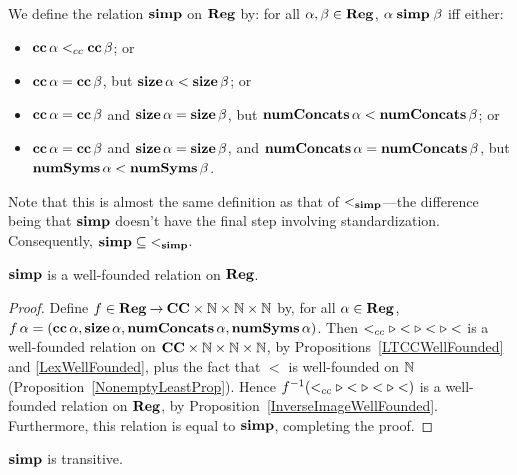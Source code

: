 We define the relation $\mathrel{\mathbf{simp}}$ on $\mathbf{Reg}$ by: for all $\alpha,\beta\in
\mathbf{Reg}$, $\alpha\mathrel{\mathbf{simp}}\beta$ iff either:
\begin{itemize}
\item $\mathbf{cc}\,\alpha\mathrel{<_{cc}}\mathbf{cc}\,\beta$; or

\item $\mathbf{cc}\,\alpha = \mathbf{cc}\,\beta$, but $\mathbf{size}\,\alpha < \mathbf{size}\,\beta$; or

\item $\mathbf{cc}\,\alpha = \mathbf{cc}\,\beta$ and $\mathbf{size}\,\alpha = \mathbf{size}\,\beta$,
  but $\mathbf{numConcats}\,\alpha < \mathbf{numConcats}\,\beta$; or

\item $\mathbf{cc}\,\alpha = \mathbf{cc}\,\beta$ and $\mathbf{size}\,\alpha =
  \mathbf{size}\,\beta$, and $\mathbf{numConcats}\,\alpha = \mathbf{numConcats}\,\beta$, but
  $\mathbf{numSyms}\,\alpha < \mathbf{numSyms}\,\beta$.
\end{itemize}
Note that this is almost the same definition as that of
$\mathrel{<_{\mathbf{simp}}}$---the difference being that $\mathrel{\mathbf{simp}}$ doesn't have the final
step involving standardization. Consequently, ${\mathrel{\mathbf{simp}}}\subseteq{\mathrel{<_{\mathbf{simp}}}}$.

\begin{proposition}
\label{SimpWF}
$\mathrel{\mathbf{simp}}$ is a well-founded relation on $\mathbf{Reg}$.
\end{proposition}

\begin{proof}
Define $f\in\mathbf{Reg}\mathbin{\to} \mathbf{CC}\times\mathbb{N}\times\mathbb{N}\times\mathbb{N}$ by, for all
$\alpha\in\mathbf{Reg}$,
$f\,\alpha = (\mathbf{cc}\,\alpha,\mathbf{size}\,\alpha,
\mathbf{numConcats}\,\alpha,\mathbf{numSyms}\,\alpha)$. Then
${\mathrel{<_{cc}}} \mathrel{\triangleright} {<} \mathrel{\triangleright} {<} \mathrel{\triangleright} {<}$ is a well-founded relation on
$\mathbf{CC}\times\mathbb{N}\times\mathbb{N}\times\mathbb{N}$, by
Propositions~\ref{LTCCWellFounded} and \ref{LexWellFounded}, plus the
fact that $<$ is well-founded on $\mathbb{N}$
(Proposition~\ref{NonemptyLeastProp}).  Hence
$f^{-1}({\mathrel{<_{cc}}} \mathrel{\triangleright} {<} \mathrel{\triangleright} {<} \mathrel{\triangleright} {<})$ is a well-founded
relation on $\mathbf{Reg}$, by Proposition~\ref{InverseImageWellFounded}.
Furthermore, this relation is equal to $\mathrel{\mathbf{simp}}$, completing the proof.
\end{proof}

\begin{proposition}
\label{SimpTrans}
$\mathrel{\mathbf{simp}}$ is transitive.
\end{proposition}

